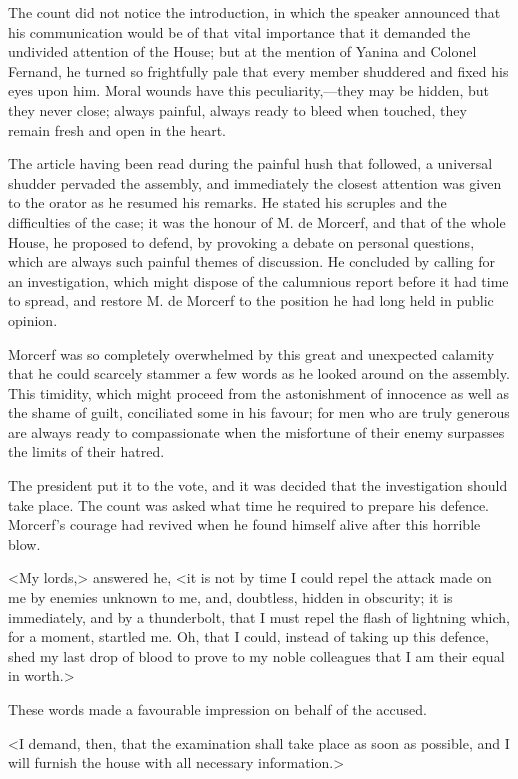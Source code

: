  The count did not notice the introduction, in which the speaker announced that his communication would be of that vital importance that it demanded the undivided attention of the House; but at the mention of Yanina and Colonel Fernand, he turned so frightfully pale that every member shuddered and fixed his eyes upon him. Moral wounds have this peculiarity,—they may be hidden, but they never close; always painful, always ready to bleed when touched, they remain fresh and open in the heart. 

 The article having been read during the painful hush that followed, a universal shudder pervaded the assembly, and immediately the closest attention was given to the orator as he resumed his remarks. He stated his scruples and the difficulties of the case; it was the honour of M. de Morcerf, and that of the whole House, he proposed to defend, by provoking a debate on personal questions, which are always such painful themes of discussion. He concluded by calling for an investigation, which might dispose of the calumnious report before it had time to spread, and restore M. de Morcerf to the position he had long held in public opinion. 

 Morcerf was so completely overwhelmed by this great and unexpected calamity that he could scarcely stammer a few words as he looked around on the assembly. This timidity, which might proceed from the astonishment of innocence as well as the shame of guilt, conciliated some in his favour; for men who are truly generous are always ready to compassionate when the misfortune of their enemy surpasses the limits of their hatred. 

 The president put it to the vote, and it was decided that the investigation should take place. The count was asked what time he required to prepare his defence. Morcerf's courage had revived when he found himself alive after this horrible blow. 

 <My lords,> answered he, <it is not by time I could repel the attack made on me by enemies unknown to me, and, doubtless, hidden in obscurity; it is immediately, and by a thunderbolt, that I must repel the flash of lightning which, for a moment, startled me. Oh, that I could, instead of taking up this defence, shed my last drop of blood to prove to my noble colleagues that I am their equal in worth.> 

 These words made a favourable impression on behalf of the accused. 

 <I demand, then, that the examination shall take place as soon as possible, and I will furnish the house with all necessary information.> 

